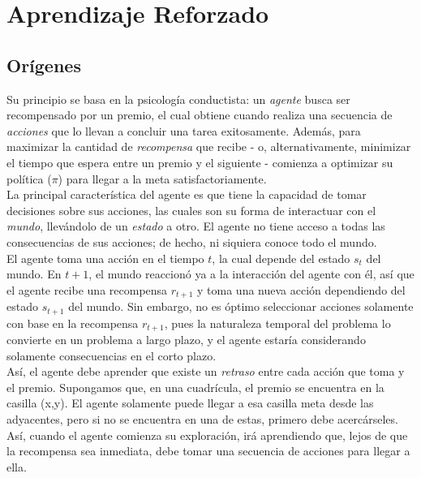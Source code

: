 \section{Aprendizaje Reforzado}

\subsection{Or\'igenes}

Su principio se basa en la psicolog\'ia conductista: un \textit{agente} busca ser recompensado por un premio, el cual obtiene cuando realiza una secuencia de \textit{acciones} que lo llevan a concluir una tarea exitosamente. Adem\'as, para maximizar la cantidad de \textit{recompensa} que recibe - o, alternativamente, minimizar el tiempo que espera entre un premio y el siguiente - comienza a optimizar su pol\'itica (\textit{$\pi$}) para llegar a la meta satisfactoriamente.\\

La principal caracter\'istica del agente es que tiene la capacidad de tomar decisiones sobre sus acciones, las cuales son su forma de interactuar con el \textit{mundo}, llev\'andolo de un \textit{estado} a otro. El agente no tiene acceso a todas las consecuencias de sus acciones; de hecho, ni siquiera conoce todo el mundo.\\

El agente toma una acci\'on en el tiempo $t$, la cual depende del estado $s_t$ del mundo. En $t+1$, el mundo reaccion\'o ya a la interacci\'on del agente con \'el, as\'i que el agente recibe una recompensa $r_{t+1}$ y toma una nueva acci\'on dependiendo del estado $s_{t+1}$ del mundo. Sin embargo, no es \'optimo seleccionar acciones solamente con base en la recompensa $r_{t+1}$, pues la naturaleza temporal del problema lo convierte en un problema a largo plazo, y el agente estar\'ia considerando solamente consecuencias en el corto plazo.\\

As\'i, el agente debe aprender que existe un \textit{retraso} entre cada acci\'on que toma y el premio. Supongamos que, en una cuadr\'icula, el premio se encuentra en la casilla (x,y). El agente solamente puede llegar a esa casilla meta desde las adyacentes, pero si no se encuentra en una de estas, primero debe acerc\'arseles. As\'i, cuando el agente comienza su exploraci\'on, ir\'a aprendiendo que, lejos de que la recompensa sea inmediata, debe tomar una secuencia de acciones para llegar a ella.\\

